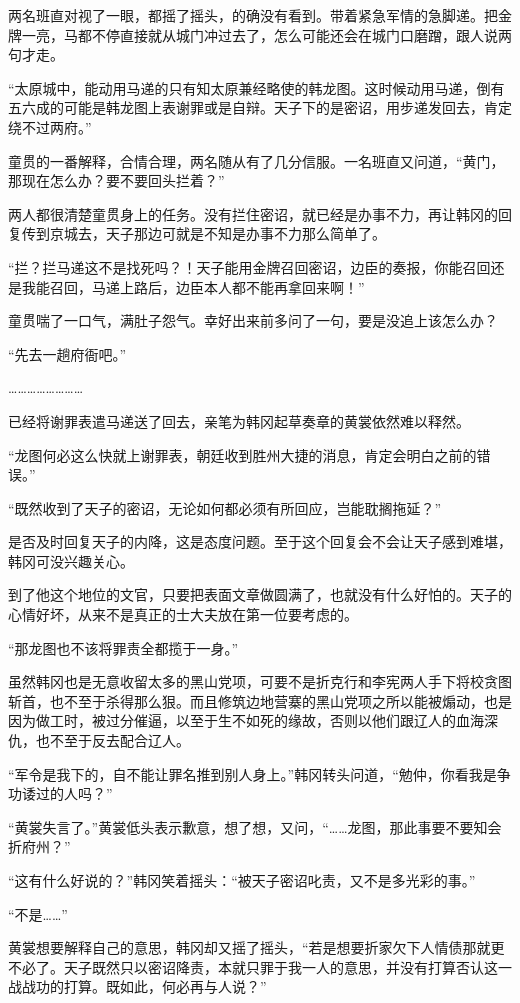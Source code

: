 两名班直对视了一眼，都摇了摇头，的确没有看到。带着紧急军情的急脚递。把金牌一亮，马都不停直接就从城门冲过去了，怎么可能还会在城门口磨蹭，跟人说两句才走。

“太原城中，能动用马递的只有知太原兼经略使的韩龙图。这时候动用马递，倒有五六成的可能是韩龙图上表谢罪或是自辩。天子下的是密诏，用步递发回去，肯定绕不过两府。”

童贯的一番解释，合情合理，两名随从有了几分信服。一名班直又问道，“黄门，那现在怎么办？要不要回头拦着？”

两人都很清楚童贯身上的任务。没有拦住密诏，就已经是办事不力，再让韩冈的回复传到京城去，天子那边可就是不知是办事不力那么简单了。

“拦？拦马递这不是找死吗？！天子能用金牌召回密诏，边臣的奏报，你能召回还是我能召回，马递上路后，边臣本人都不能再拿回来啊！”

童贯喘了一口气，满肚子怨气。幸好出来前多问了一句，要是没追上该怎么办？

“先去一趟府衙吧。”

……………………

已经将谢罪表遣马递送了回去，亲笔为韩冈起草奏章的黄裳依然难以释然。

“龙图何必这么快就上谢罪表，朝廷收到胜州大捷的消息，肯定会明白之前的错误。”

“既然收到了天子的密诏，无论如何都必须有所回应，岂能耽搁拖延？”

是否及时回复天子的内降，这是态度问题。至于这个回复会不会让天子感到难堪，韩冈可没兴趣关心。

到了他这个地位的文官，只要把表面文章做圆满了，也就没有什么好怕的。天子的心情好坏，从来不是真正的士大夫放在第一位要考虑的。

“那龙图也不该将罪责全都揽于一身。”

虽然韩冈也是无意收留太多的黑山党项，可要不是折克行和李宪两人手下将校贪图斩首，也不至于杀得那么狠。而且修筑边地营寨的黑山党项之所以能被煽动，也是因为做工时，被过分催逼，以至于生不如死的缘故，否则以他们跟辽人的血海深仇，也不至于反去配合辽人。

“军令是我下的，自不能让罪名推到别人身上。”韩冈转头问道，“勉仲，你看我是争功诿过的人吗？”

“黄裳失言了。”黄裳低头表示歉意，想了想，又问，“……龙图，那此事要不要知会折府州？”

“这有什么好说的？”韩冈笑着摇头：“被天子密诏叱责，又不是多光彩的事。”

“不是……”

黄裳想要解释自己的意思，韩冈却又摇了摇头，“若是想要折家欠下人情债那就更不必了。天子既然只以密诏降责，本就只罪于我一人的意思，并没有打算否认这一战战功的打算。既如此，何必再与人说？”


